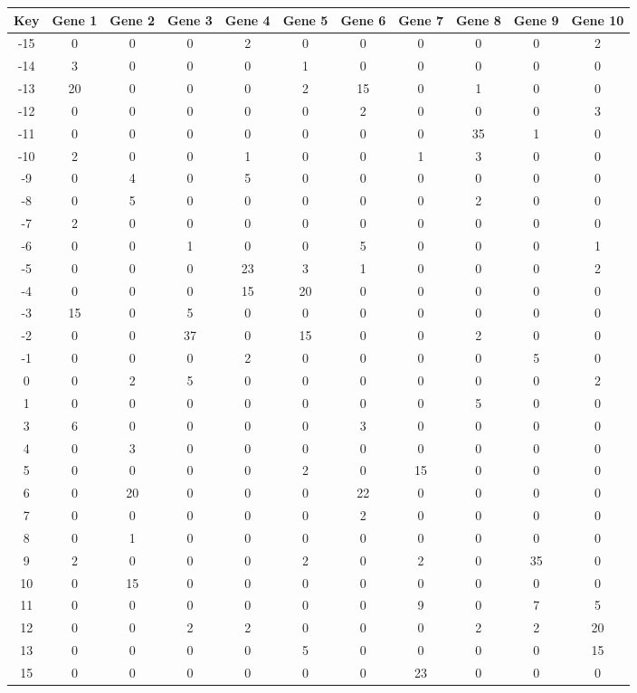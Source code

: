 \begin{tabular}{|c|c|c|c|c|c|c|c|c|c|c|}
\hline
Key & Gene 1 & Gene 2 & Gene 3 & Gene 4 & Gene 5 & Gene 6 & Gene 7 & Gene 8 & Gene 9 & Gene 10 \\
\hline
-15 & 0 & 0 & 0 & 2 & 0 & 0 & 0 & 0 & 0 & 2 \\
-14 & 3 & 0 & 0 & 0 & 1 & 0 & 0 & 0 & 0 & 0 \\
-13 & 20 & 0 & 0 & 0 & 2 & 15 & 0 & 1 & 0 & 0 \\
-12 & 0 & 0 & 0 & 0 & 0 & 2 & 0 & 0 & 0 & 3 \\
-11 & 0 & 0 & 0 & 0 & 0 & 0 & 0 & 35 & 1 & 0 \\
-10 & 2 & 0 & 0 & 1 & 0 & 0 & 1 & 3 & 0 & 0 \\
-9 & 0 & 4 & 0 & 5 & 0 & 0 & 0 & 0 & 0 & 0 \\
-8 & 0 & 5 & 0 & 0 & 0 & 0 & 0 & 2 & 0 & 0 \\
-7 & 2 & 0 & 0 & 0 & 0 & 0 & 0 & 0 & 0 & 0 \\
-6 & 0 & 0 & 1 & 0 & 0 & 5 & 0 & 0 & 0 & 1 \\
-5 & 0 & 0 & 0 & 23 & 3 & 1 & 0 & 0 & 0 & 2 \\
-4 & 0 & 0 & 0 & 15 & 20 & 0 & 0 & 0 & 0 & 0 \\
-3 & 15 & 0 & 5 & 0 & 0 & 0 & 0 & 0 & 0 & 0 \\
-2 & 0 & 0 & 37 & 0 & 15 & 0 & 0 & 2 & 0 & 0 \\
-1 & 0 & 0 & 0 & 2 & 0 & 0 & 0 & 0 & 5 & 0 \\
0 & 0 & 2 & 5 & 0 & 0 & 0 & 0 & 0 & 0 & 2 \\
1 & 0 & 0 & 0 & 0 & 0 & 0 & 0 & 5 & 0 & 0 \\
3 & 6 & 0 & 0 & 0 & 0 & 3 & 0 & 0 & 0 & 0 \\
4 & 0 & 3 & 0 & 0 & 0 & 0 & 0 & 0 & 0 & 0 \\
5 & 0 & 0 & 0 & 0 & 2 & 0 & 15 & 0 & 0 & 0 \\
6 & 0 & 20 & 0 & 0 & 0 & 22 & 0 & 0 & 0 & 0 \\
7 & 0 & 0 & 0 & 0 & 0 & 2 & 0 & 0 & 0 & 0 \\
8 & 0 & 1 & 0 & 0 & 0 & 0 & 0 & 0 & 0 & 0 \\
9 & 2 & 0 & 0 & 0 & 2 & 0 & 2 & 0 & 35 & 0 \\
10 & 0 & 15 & 0 & 0 & 0 & 0 & 0 & 0 & 0 & 0 \\
11 & 0 & 0 & 0 & 0 & 0 & 0 & 9 & 0 & 7 & 5 \\
12 & 0 & 0 & 2 & 2 & 0 & 0 & 0 & 2 & 2 & 20 \\
13 & 0 & 0 & 0 & 0 & 5 & 0 & 0 & 0 & 0 & 15 \\
15 & 0 & 0 & 0 & 0 & 0 & 0 & 23 & 0 & 0 & 0 \\
\hline
\end{tabular}